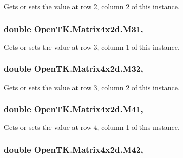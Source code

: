 Gets or sets the value at row 2, column 2 of this instance. 

\hypertarget{struct_open_t_k_1_1_matrix4x2d_af2e40cf33c323765e5c05308fe88c819}{
\subsubsection[{M31}]{\setlength{\rightskip}{0pt plus 5cm}double Open\-T\-K.\-Matrix4x2d.\-M31\hspace{0.3cm}{\ttfamily [get]}, {\ttfamily [set]}}}\label{struct_open_t_k_1_1_matrix4x2d_af2e40cf33c323765e5c05308fe88c819}


Gets or sets the value at row 3, column 1 of this instance. 

\hypertarget{struct_open_t_k_1_1_matrix4x2d_a61b5126bb2623dc736e9edc588357c4e}{
\subsubsection[{M32}]{\setlength{\rightskip}{0pt plus 5cm}double Open\-T\-K.\-Matrix4x2d.\-M32\hspace{0.3cm}{\ttfamily [get]}, {\ttfamily [set]}}}\label{struct_open_t_k_1_1_matrix4x2d_a61b5126bb2623dc736e9edc588357c4e}


Gets or sets the value at row 3, column 2 of this instance. 

\hypertarget{struct_open_t_k_1_1_matrix4x2d_a6a3d7245b475d3543c7de03740cf9e3d}{
\subsubsection[{M41}]{\setlength{\rightskip}{0pt plus 5cm}double Open\-T\-K.\-Matrix4x2d.\-M41\hspace{0.3cm}{\ttfamily [get]}, {\ttfamily [set]}}}\label{struct_open_t_k_1_1_matrix4x2d_a6a3d7245b475d3543c7de03740cf9e3d}


Gets or sets the value at row 4, column 1 of this instance. 

\hypertarget{struct_open_t_k_1_1_matrix4x2d_ad35fb56e56ecaecf7444a70a6017eec9}{
\subsubsection[{M42}]{\setlength{\rightskip}{0pt plus 5cm}double Open\-T\-K.\-Matrix4x2d.\-M42\hspace{0.3cm}{\ttfamily [get]}, {\ttfamily [set]}}}\label{struct_open_t_k_1_1_matrix4x2d_ad35fb56e56ecaecf7444a70a6017eec9}


